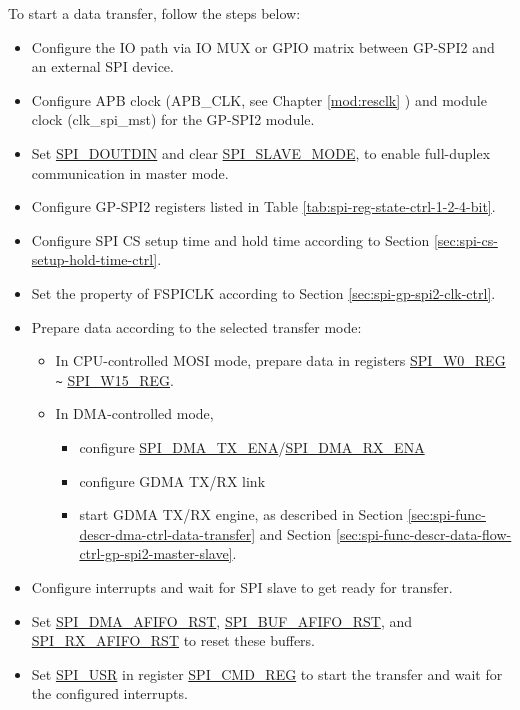 \documentclass[main\_\_EN.tex]{subfiles}
\begin{document}
To start a data transfer, follow the steps below:
\begin{itemize}
    \item Configure the IO path via IO MUX or GPIO matrix between GP-SPI2 and an external SPI device.
    \item Configure APB clock (APB\_CLK, see Chapter \ref{mod:resclk} \textit{}) and module clock (clk\_spi\_mst) for the GP-SPI2 module.
    \item Set \hyperref[fielddesc:SPIDOUTDIN]{SPI\_DOUTDIN} and clear \hyperref[fielddesc:SPISLAVEMODE]{SPI\_SLAVE\_MODE}, to enable full-duplex communication in master mode.

    \item Configure GP-SPI2 registers listed in Table \ref{tab:spi-reg-state-ctrl-1-2-4-bit}.

    \item Configure SPI CS setup time and hold time according to Section \ref{sec:spi-cs-setup-hold-time-ctrl}.

    \item Set the property of FSPICLK according to Section \ref{sec:spi-gp-spi2-clk-ctrl}.

    \item Prepare data according to the selected transfer mode:
    \begin{itemize}
        \item In CPU-controlled MOSI mode, prepare data in registers \hyperref[regdesc:SPIW0REG]{SPI\_W0\_REG} \verb+~+ \hyperref[regdesc:SPIW15REG]{SPI\_W15\_REG}.

        \item In DMA-controlled mode,
        \begin{itemize}
            \item configure \hyperref[fielddesc:SPIDMATXENA]{SPI\_DMA\_TX\_ENA}/\hyperref[fielddesc:SPIDMARXENA]{SPI\_DMA\_RX\_ENA}
            \item configure GDMA TX/RX link
            \item start GDMA TX/RX engine, as described in Section \ref{sec:spi-func-descr-dma-ctrl-data-transfer} and Section \ref{sec:spi-func-descr-data-flow-ctrl-gp-spi2-master-slave}.
        \end{itemize}
    \end{itemize}

    \item Configure interrupts \label{other:spi-item-config-interrupts-spi-slave} and wait for SPI slave to get ready for transfer.

    \item Set \hyperref[fielddesc:SPIDMAAFIFORST]{SPI\_DMA\_AFIFO\_RST}, \hyperref[fielddesc:SPIBUFAFIFORST]{SPI\_BUF\_AFIFO\_RST}, and \hyperref[fielddesc:SPIRXAFIFORST]{SPI\_RX\_AFIFO\_RST} to reset these buffers.

    \item Set \hyperref[fielddesc:SPIUSR]{SPI\_USR} in register \hyperref[regdesc:SPICMDREG]{SPI\_CMD\_REG} to start the transfer and wait for the configured interrupts.

\end{itemize}
\end{document}
